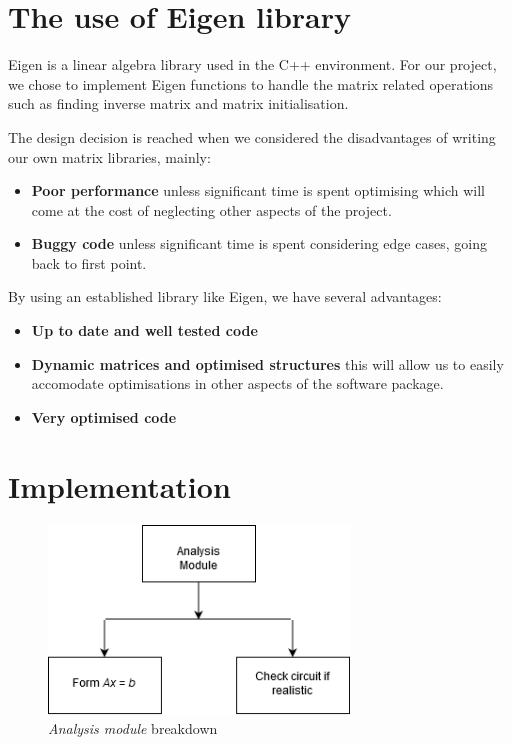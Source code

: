 \documentclass[a4paper, titlepage]{article}
\begin{document}
    \section{The use of Eigen library}
    Eigen is a linear algebra library used in the C++ environment. For our project, we chose to implement 
    Eigen functions to handle the matrix related operations such as finding inverse matrix 
    and matrix initialisation.
    \par
    The design decision is reached when we considered
    the disadvantages of writing our own matrix libraries, mainly:
    \begin{itemize}
        \item \textbf{Poor performance} unless significant time is spent optimising which will come at the cost of
        neglecting other aspects of the project.
        \item \textbf{Buggy code} unless significant time is spent considering edge cases, going back to first point.
    \end{itemize}
    By using an established library like Eigen, we have several advantages:
    \begin{itemize}
        \item \textbf{Up to date and well tested code}
        \item \textbf{Dynamic matrices and optimised structures} this will allow us to easily accomodate  
        optimisations in other aspects of the software package.
        \item \textbf{Very optimised code}

    \end{itemize}
    \pagebreak

    \section{Implementation}
    \begin{figure}[htp]
        \centering
        \includegraphics[width=80mm,scale=1]{Analysis breakdown}
        \caption{\textit{Analysis module} breakdown}
        \label{fig:figure3}
    \end{figure}
\end{document}
